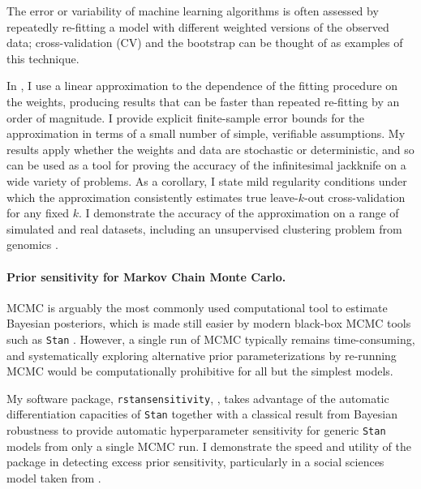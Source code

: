 The error or variability of machine learning algorithms is often assessed by
repeatedly re-fitting a model with different weighted versions of the observed
data; cross-validation (CV) and the bootstrap can be thought of as examples of
this technique.

In \citet{giordano:2019:ij}, I use a linear approximation to the
dependence of the fitting procedure on the weights, producing results that can
be faster than repeated re-fitting by an order of magnitude. I provide explicit
finite-sample error bounds for the approximation in terms of a small number of
simple, verifiable assumptions.  My results apply whether the weights and data
are stochastic or deterministic, and so can be used as a tool for proving the
accuracy of the infinitesimal jackknife on a wide variety of problems. As a
corollary, I state mild regularity conditions under which the approximation
consistently estimates true leave-$k$-out cross-validation for any fixed $k$. I
demonstrate the accuracy of the approximation on a range of simulated and real
datasets, including an unsupervised clustering problem from genomics
\citep{Luan:2003:clustering, shoemaker:2015:ultrasensitive}.


\paragraph{Prior sensitivity for Markov Chain Monte Carlo.}

MCMC is arguably the most commonly used computational tool to estimate Bayesian
posteriors, which is made still easier by modern black-box MCMC tools such as
\texttt{Stan} \citep{carpenter:2017:stan, rstan}.  However, a single run of MCMC
typically remains time-consuming, and systematically exploring alternative prior
parameterizations by re-running MCMC would be computationally prohibitive for
all but the simplest models.

My software package, \texttt{rstansensitivity},
\citep{giordano:2020:rstansensitivity, giordano:2018:mcmchyper}, takes advantage
of the automatic differentiation capacities of \texttt{Stan}
\citep{carpenter:2015:stanmath} together with a classical result from  Bayesian
robustness \citep{gustafson:1996:localposterior, basu:1996:local,
giordano:2018:covariances} to provide automatic hyperparameter sensitivity for
generic \texttt{Stan} models from only a single MCMC run.  I demonstrate the
speed and utility of the package in detecting excess prior sensitivity,
particularly in a social sciences model taken from \citet[Chapter
13.5]{gelman:2006:arm}.


